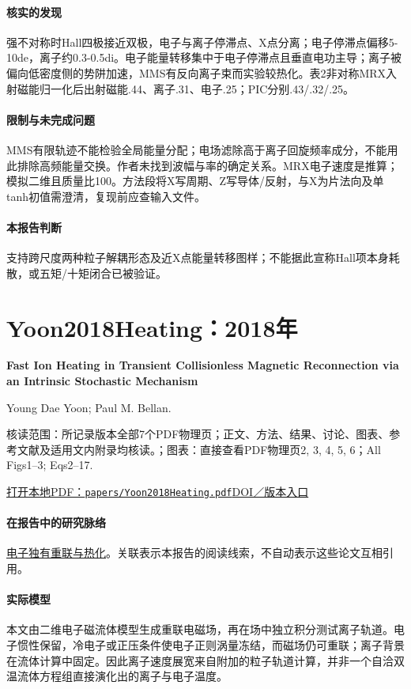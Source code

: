 \documentclass[UTF8,a4paper,11pt,openany,fontset=fandol]{ctexbook}
\begin{document}
\paragraph{核实的发现}强不对称时Hall四极接近双极，电子与离子停滞点、X点分离；电子停滞点偏移5-10de，离子约0.3-0.5di。电子能量转移集中于电子停滞点且垂直电功主导；离子被偏向低密度侧的势阱加速，MMS有反向离子束而实验较热化。表2非对称MRX入射磁能归一化后出射磁能.44、离子.31、电子.25；PIC分别.43/.32/.25。

\paragraph{限制与未完成问题}MMS有限轨迹不能检验全局能量分配；电场滤除高于离子回旋频率成分，不能用此排除高频能量交换。作者未找到波幅与率的确定关系。MRX电子速度是推算；模拟二维且质量比100。方法段将X写周期、Z写导体/反射，与X为片法向及单tanh初值需澄清，复现前应查输入文件。

\paragraph{本报告判断}支持跨尺度两种粒子解耦形态及近X点能量转移图样；不能据此宣称Hall项本身耗散，或五矩/十矩闭合已被验证。

\section{Yoon2018Heating：2018年}\label{paper:Yoon2018Heating}

\textbf{Fast Ion Heating in Transient Collisionless Magnetic Reconnection via an Intrinsic Stochastic Mechanism}\citep{Yoon2018Heating}\

Young Dae Yoon;  Paul M. Bellan.

\textsf{核读范围：}所记录版本全部7个PDF物理页；正文、方法、结果、讨论、图表、参考文献及适用文内附录均核读。；\textsf{图表：}直接查看PDF物理页2, 3, 4, 5, 6；All Figs1–3;  Eqs2–17.

\href{run:../papers/Yoon2018Heating.pdf}{打开本地PDF：\texttt{papers/Yoon2018Heating.pdf}}\quad\href{https://doi.org/10.3847/2041-8213/aaf0a3}{DOI／版本入口}

\paragraph{在报告中的研究脉络}\hyperref[story:energy]{电子独有重联与热化}。关联表示本报告的阅读线索，不自动表示这些论文互相引用。

\paragraph{实际模型}本文由二维电子磁流体模型生成重联电磁场，再在场中独立积分测试离子轨道。电子惯性保留，冷电子或正压条件使电子正则涡量冻结，而磁场仍可重联；离子背景在流体计算中固定。因此离子速度展宽来自附加的粒子轨道计算，并非一个自洽双温流体方程组直接演化出的离子与电子温度。
\end{document}
